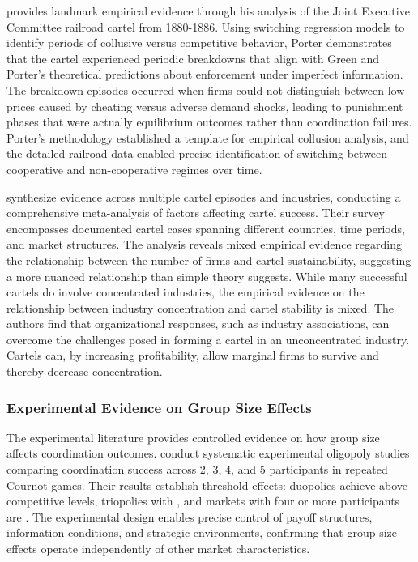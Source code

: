 \textcite{porter_study_1983} provides landmark empirical evidence through his analysis of the Joint Executive Committee railroad cartel from 1880-1886. Using switching regression models to identify periods of collusive versus competitive behavior, Porter demonstrates that the cartel experienced periodic breakdowns that align with Green and Porter's theoretical predictions about enforcement under imperfect information. The breakdown episodes occurred when firms could not distinguish between low prices caused by cheating versus adverse demand shocks, leading to punishment phases that were actually equilibrium outcomes rather than coordination failures. Porter's methodology established a template for empirical collusion analysis, and the detailed railroad data enabled precise identification of switching between cooperative and non-cooperative regimes over time.

\textcite{levenstein_what_2006} synthesize evidence across multiple cartel episodes and industries, conducting a comprehensive meta-analysis of factors affecting cartel success. Their survey encompasses documented cartel cases spanning different countries, time periods, and market structures. The analysis reveals mixed empirical evidence regarding the relationship between the number of firms and cartel sustainability, suggesting a more nuanced relationship than simple theory suggests. While many successful cartels do involve concentrated industries, the empirical evidence on the relationship between industry concentration and cartel stability is mixed. The authors find that organizational responses, such as industry associations, can overcome the challenges posed in forming a cartel in an unconcentrated industry. Cartels can, by increasing profitability, allow marginal firms to survive and thereby decrease concentration.

\subsubsection*{Experimental Evidence on Group Size Effects}

The experimental literature provides controlled evidence on how group size affects coordination outcomes. \textcite{huck_two_2004} conduct systematic experimental oligopoly studies comparing coordination success across 2, 3, 4, and 5 participants in repeated Cournot games. Their results establish threshold effects: duopolies achieve  above competitive levels, triopolies  with , and markets with four or more participants are  \parencite[p. 435]{huck_two_2004}. The experimental design enables precise control of payoff structures, information conditions, and strategic environments, confirming that group size effects operate independently of other market characteristics.

